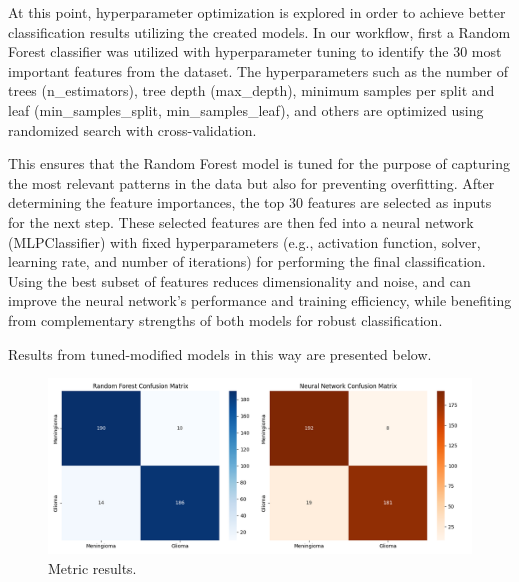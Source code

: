 \documentclass[11pt,a4paper]{article}
\begin{document}
		At this point, hyperparameter optimization is explored in order to achieve better classification
		results utilizing the created models.
		In our workflow,  first a Random Forest classifier was utilized with hyperparameter tuning 
		to identify the 30 most important features from the dataset. 
		The hyperparameters such as the number of trees (n\_estimators), tree depth (max\_depth), 
		minimum samples per split and leaf (min\_samples\_split, min\_samples\_leaf), 
		and others are optimized using randomized search with cross-validation. 
		
		This ensures that the Random Forest model is tuned for the purpose of capturing
		the most relevant patterns in the data but also for preventing overfitting. 
		After determining the feature importances, the top 30 features are selected as inputs for the next step.
		These selected features are then fed into a neural network (MLPClassifier) 
		with fixed hyperparameters (e.g., activation function, solver, learning rate, and number of iterations) for
		performing the final classification. 
		Using the best subset of features reduces dimensionality and noise, and can improve the 
		neural network’s performance and training efficiency, 
		while benefiting from complementary strengths of both models for robust classification.
		
		Results from tuned-modified models in this way are presented below.


		\begin{figure}[H]
			\centering
			\includegraphics[width=1.1\textwidth]{images/metrics_hyper.png}
			\caption{Metric results.}
			\label{fig1:}
		\end{figure}		
\end{document}
